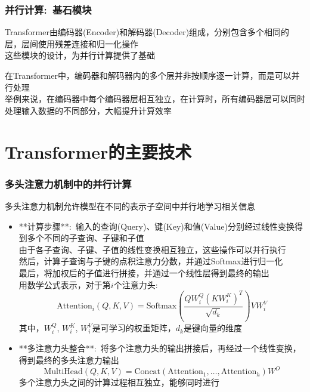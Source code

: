 \begin{frame}
    \frametitle{并行计算:~基石模块}
    \textrm{Transformer}由编码器\textrm{(Encoder)}和解码器\textrm{(Decoder)}组成，分别包含多个相同的层，层间使用残差连接和归一化操作\\
    这些模块的设计，为并行计算提供了基础

    在\textrm{Transformer}中，编码器和解码器内的多个层并非按顺序逐一计算，而是可以并行处理\\
    举例来说，在编码器中每个编码器层相互独立，在计算时，所有编码器层可以同时处理输入数据的不同部分，大幅提升计算效率
\end{frame}

\section{\rm{Transformer}的主要技术}
\begin{frame}
    \frametitle{多头注意力机制中的并行计算}
    多头注意力机制允许模型在不同的表示子空间中并行地学习相关信息
    \begin{itemize}
	    \item **计算步骤**:~输入的查询\textrm{(Query)}、键\textrm{(Key)}和值\textrm{(Value)}分别经过线性变换得到多个不同的子查询、子键和子值\\
		    由于各子查询、子键、子值的线性变换相互独立，这些操作可以并行执行\\
		    然后，计算子查询与子键的点积注意力分数，并通过\textrm{Softmax}进行归一化\\
		    最后，将加权后的子值进行拼接，并通过一个线性层得到最终的输出\\

		    用数学公式表示，对于第$i$个注意力头:~
		    \begin{displaymath}
			    \text{Attention}_i(Q, K, V) = \text{Softmax}(\frac{Q W_i^Q (K W_i^K)^T}{\sqrt{d_k}}) V W_i^V 
		    \end{displaymath}
        其中，$W_i^Q$, $W_i^K$, $W_i^V$是可学习的权重矩阵，$d_k$是键向量的维度
        \item **多注意力头整合**:~将多个注意力头的输出拼接后，再经过一个线性变换，得到最终的多头注意力输出
		\begin{displaymath}
			\text{MultiHead}(Q, K, V) = \text{Concat}(\text{Attention}_1, \ldots, \text{Attention}_h) W^O
		\end{displaymath}
        多个注意力头之间的计算过程相互独立，能够同时进行
    \end{itemize}
\end{frame}


